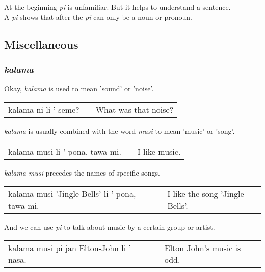 At the beginning \textit{pi} is unfamiliar. 
But it helps to understand a sentence. \\
A \textit{pi} shows that after the \textit{pi} can only be a noun or pronoun.

%
\subsection*{Miscellaneous}
%
\subsubsection*{\textit{kalama}}
%
Okay, \textit{kalama} is used to mean 'sound' or 'noise'.  \\
\begin{supertabular}{p{5,5cm}|ll}
kalama ni li ' seme? && What was that noise? \\
\end{supertabular}  

\textit{kalama} is usually combined with the word \textit{musi} to mean 'music' or 'song'. \\
\begin{supertabular}{p{5,5cm}|ll}
kalama musi li ' pona, tawa mi. && I like music. \\
\end{supertabular}  

\textit{kalama musi} precedes the names of specific songs. \\
\begin{supertabular}{p{5,5cm}|ll}
kalama musi 'Jingle Bells' li ' pona, tawa mi. && I like the song 'Jingle Bells'. \\
\end{supertabular}  

And we can use \textit{pi} to talk about music by a certain group or artist. \\
\begin{supertabular}{p{5,5cm}|ll}
kalama musi pi jan Elton-John li ' nasa. && Elton John's music is odd. \\
\end{supertabular}  

